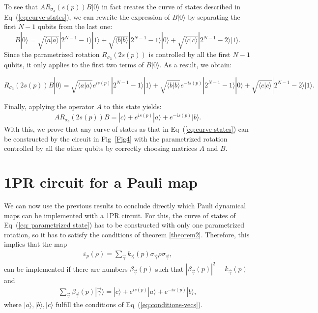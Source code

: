 \documentclass[10pt,letterpaper]{article} %
\newcommand{\fref}[1]{Fig~\ref{#1}}
\newcommand{\eref}[1]{Eq~(\ref{#1})}
\begin{document}
To see that $A R_{\sigma_3}(s(p)) B |0\rangle$ in fact creates
the curve of states described in \eref{eq:curve-states}, we can rewrite the expression of $B|0\rangle$ by 
separating the first $N-1$ qubits from the last one:
$$B|0\rangle = \sqrt{\langle a | a \rangle} |2^{N-1}-1\rangle |1\rangle + \sqrt{\langle b | b \rangle} |2^{N-1}-1\rangle |0\rangle + \sqrt{\langle c | c \rangle} |2^{N-1}-2\rangle |1\rangle.$$
Since the parametrized rotation $R_{\sigma_3}(2s(p))$ is controlled by all the first $N-1$ qubits, it only applies to the first two terms of $B|0\rangle$. As a result, we obtain: 

$$
R_{\sigma_3}(2s(p))B|0\rangle =\sqrt{\langle a | a \rangle} e^{is(p)} |2^{N-1}-1\rangle |1\rangle + \sqrt{\langle b | b \rangle} e^{-is(p)} |2^{N-1}-1\rangle |0\rangle + \sqrt{\langle c | c \rangle} |2^{N-1}-2\rangle |1\rangle.
$$

Finally, applying the  operator $A$ to this state yields: 
\begin{align*}
AR_{\sigma_3}(2s(p))B = |c\rangle + e^{is(p)} |a\rangle + e^{-is(p)} |b\rangle.
\end{align*}
With this, we prove that any curve of states as that in \eref{eq:curve-states} 
can be constructed by the circuit in  \fref{Fig4} with the parametrized rotation 
controlled by all the other qubits 
by correctly choosing matrices $A$ and $B$.

 
\section{1PR circuit for a Pauli map} %
\label{sec: 1PR circuit for a Pauli map}

We can now use the previous results to conclude directly which Pauli dynamical maps
can be implemented with a 1PR circuit.
For this, the curve of states of \eref{eq: parametrized state} 
has to be constructed with only one parametrized rotation,
so it has to satisfy the conditions of theorem \ref{theorem2}.
Therefore, this implies that the map
\begin{eqnarray}
\varepsilon_p(\rho) = \sum_{\vec{\gamma}} k_{\vec{\gamma}}(p) \sigma_{\vec{\gamma}} \rho \sigma_{\vec{\gamma}},
\end{eqnarray}
can be implemented  if there are numbers $\beta_{\vec{\gamma}}(p)$ such that $|\beta_{\vec{\gamma}}(p)|^2 = k_{\vec{\gamma}}(p)$ and
\begin{eqnarray}
\label{eq:vec}
\sum_{\vec{\gamma}} \beta_{\vec{\gamma}}(p) |\vec{\gamma}\rangle = |c\rangle +  e^{is(p)} |a\rangle + e^{-is(p)}|b\rangle,
\end{eqnarray}
where $|a\rangle,|b\rangle,|c\rangle$ fulfill
the conditions of \eref{eq:conditions-vecs}.
\end{document}
